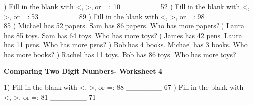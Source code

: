 \documentclass{article}%
\begin{document}
\newline%
\newline%
) Fill in the blank with <, >, or =: 10 \_\_\_\_\_\_\_ 52%
\newline%
\newline%
) Fill in the blank with <, >, or =: 53 \_\_\_\_\_\_\_ 89%
\newline%
\newline%
) Fill in the blank with <, >, or =: 98 \_\_\_\_\_\_\_ 85%
\newline%
\newline%
) Michael has 52 papers. Sam has 86 papers. Who has more papers?%
\newline%
\newline%
) Laura has 85 toys. Sam has 64 toys. Who has more toys?%
\newline%
\newline%
) James has 42 pens. Laura has 11 pens. Who has more pens?%
\newline%
\newline%
) Bob has 4 books. Michael has 3 books. Who has more books?%
\newline%
\newline%
) Rachel has 11 toys. Bob has 86 toys. Who has more toys?%
\newline%
\newline%
\newline%
\pagebreak%
\large%
\begin{center}%
\textbf{Comparing Two Digit Numbers- Worksheet 4}%
\newline%
\newline%
\newline%
\end{center} \normalsize%
1) Fill in the blank with <, >, or =: 88 \_\_\_\_\_\_\_ 67%
\newline%
\newline%
) Fill in the blank with <, >, or =: 81 \_\_\_\_\_\_\_ 71%
\newline%
\newline%
\newline%
\end{document}
